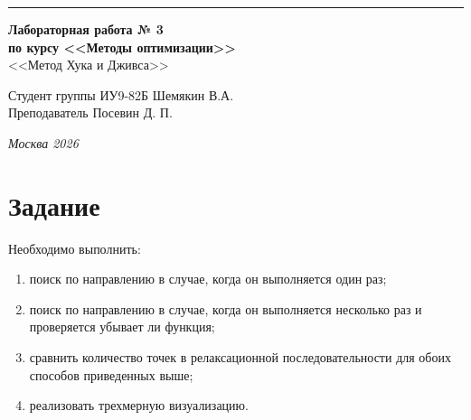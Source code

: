 \documentclass[a4paper, 14pt]{extarticle}
\begin{document}
\begin{titlepage}
\vspace*{-16pt}
\hspace{30pt}\rule{0.866\textwidth}{0.4pt}
  
\vspace{11em}

\begin{center}
\Large {\bf Лабораторная работа № 3} \\ 
\large {\bf по курсу <<Методы оптимизации>>} \\
\large <<Метод Хука и Дживса>> 
\end{center}\normalsize

\vspace{8em}


\begin{flushright}
  {Студент группы ИУ9-82Б Шемякин В.А. \hspace*{15pt}\\ 
  \vspace{2ex}
  Преподаватель Посевин Д. П.\hspace*{15pt}}
\end{flushright}

\bigskip

\vfill
 

\begin{center}
\textsl{Москва 2026}
\end{center}
\end{titlepage}

\renewcommand{\ttdefault}{pcr}

\setlength{\tabcolsep}{3pt}
\newpage
\setcounter{page}{2}

\section{Задание}\label{Sect::task}
Необходимо выполнить:
\begin{enumerate}
    \item поиск по направлению в случае, когда он выполняется один раз;
    \item поиск по направлению в случае, когда он выполняется несколько раз и проверяется убывает ли функция;
    \item сравнить количество точек в релаксационной последовательности для обоих способов приведенных выше;
    \item реализовать трехмерную визуализацию.
\end{enumerate}
\end{document}
